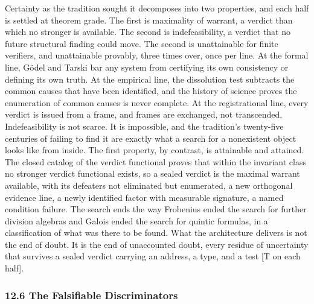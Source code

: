 \documentclass[10pt,twocolumn]{article}
\begin{document}
Certainty as the tradition sought it decomposes into two properties, and
each half is settled at theorem grade. The first is maximality of
warrant, a verdict than which no stronger is available. The second is
indefeasibility, a verdict that no future structural finding could move.
The second is unattainable for finite verifiers, and unattainable
provably, three times over, once per line. At the formal line, Gödel and
Tarski bar any system from certifying its own consistency or defining
its own truth. At the empirical line, the dissolution test subtracts the
common causes that have been identified, and the history of science
proves the enumeration of common causes is never complete. At the
registrational line, every verdict is issued from a frame, and frames
are exchanged, not transcended. Indefeasibility is not scarce. It is
impossible, and the tradition's twenty-five centuries of failing to find
it are exactly what a search for a nonexistent object looks like from
inside. The first property, by contrast, is attainable and attained. The
closed catalog of the verdict functional proves that within the
invariant class no stronger verdict functional exists, so a sealed
verdict is the maximal warrant available, with its defeaters not
eliminated but enumerated, a new orthogonal evidence line, a newly
identified factor with measurable signature, a named condition failure.
The search ends the way Frobenius ended the search for further division
algebras and Galois ended the search for quintic formulas, in a
classification of what was there to be found. What the architecture
delivers is not the end of doubt. It is the end of unaccounted doubt,
every residue of uncertainty that survives a sealed verdict carrying an
address, a type, and a test {[}T on each half{]}.

\hypertarget{the-falsifiable-discriminators}{%
\subsubsection{12.6 The Falsifiable
Discriminators}\label{the-falsifiable-discriminators}}
\end{document}
